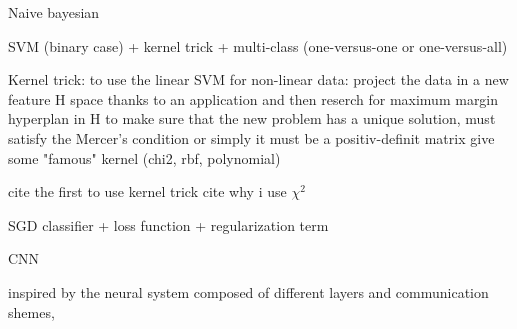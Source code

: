 Naive bayesian

SVM (binary case) + kernel trick + multi-class (one-versus-one or one-versus-all)

Kernel trick:
to use the linear SVM for non-linear data: project the data in a new feature H space thanks to an application and then reserch for maximum margin hyperplan in H
to make sure that the new problem has a unique solution, 
must satisfy the Mercer's condition or simply it must be a positiv-definit matrix
give some "famous" kernel (chi2, rbf, polynomial)

cite the first to use kernel trick
cite why i use $\chi^2$

SGD classifier + loss function + regularization term%

CNN

inspired by the neural system composed of different layers and communication shemes, 
